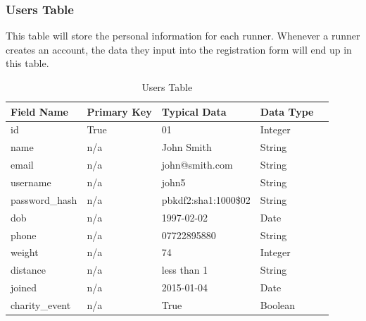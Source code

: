 \documentclass{article}[12pt,a4paper]
\begin{document}
\subsubsection{Users Table}
This table will store the personal information for each runner. Whenever a runner creates an account, the data they input into the registration form will end up in this table.

\begin{table}[htbp]
\begin{tabular}{|l|l|l|l|l|}
\hline
\textbf{Field Name}     & \textbf{Primary Key} & \textbf{Typical Data} & \textbf{Data Type} \\ \hline
id             & True        & 01                   & Integer   \\ \hline
name           & n/a         & John Smith           & String    \\ \hline
email          & n/a         & john@smith.com       & String    \\ \hline
username       & n/a         & john5                & String    \\ \hline
password\_hash & n/a         & pbkdf2:sha1:1000\$02 & String    \\ \hline
dob            & n/a         & 1997-02-02           & Date      \\ \hline
phone          & n/a         & 07722895880          & String    \\ \hline
weight         & n/a         & 74                   & Integer   \\ \hline
distance       & n/a         & less than 1          & String    \\ \hline
joined         & n/a         & 2015-01-04           & Date      \\ \hline
charity\_event & n/a         & True                 & Boolean   \\ \hline
\end{tabular}
\caption{Users Table}
\end{table}
\end{document}
